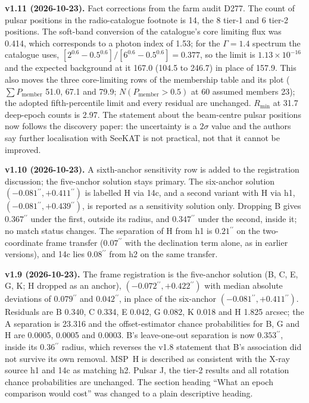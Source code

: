 \documentclass[11pt]{article}
\newcommand{\as}{\ensuremath{^{\prime\prime}}}
\begin{document}
\textbf{v1.11 (2026-10-23).} Fact corrections from the farm audit D277. The count of pulsar positions in the radio-catalogue footnote is 14, the 8 tier-1 and 6 tier-2 positions. The soft-band conversion of the catalogue's core limiting flux was 0.414, which corresponds to a photon index of 1.53; for the $\Gamma=1.4$ spectrum the catalogue uses, $[2^{0.6}-0.5^{0.6}]/[6^{0.6}-0.5^{0.6}] = 0.377$, so the limit is $1.13\times10^{-16}$ and the expected background at it 167.0 (104.5 to 246.7) in place of 157.9. This also moves the three core-limiting rows of the membership table and its plot ($\sum P_{\mathrm{member}}$ 51.0, 67.1 and 79.9; $N(P_{\mathrm{member}}>0.5)$ at 60 assumed members 23); the adopted fifth-percentile limit and every residual are unchanged. $R_{\min}$ at 31.7 deep-epoch counts is 2.97. The statement about the beam-centre pulsar positions now follows the discovery paper: the uncertainty is a $2\sigma$ value and the authors say further localisation with SeeKAT is not practical, not that it cannot be improved.

\textbf{v1.10 (2026-10-23).} A sixth-anchor sensitivity row is added to the registration discussion; the five-anchor solution stays primary. The six-anchor solution $(-0.081\as, +0.411\as)$ is labelled H via 14c, and a second variant with H via h1, $(-0.081\as, +0.439\as)$, is reported as a sensitivity solution only. Dropping B gives $0.367\as$ under the first, outside its radius, and $0.347\as$ under the second, inside it; no match status changes. The separation of H from h1 is $0.21\as$ on the two-coordinate frame transfer ($0.07\as$ with the declination term alone, as in earlier versions), and 14c lies $0.08\as$ from h2 on the same transfer.

\textbf{v1.9 (2026-10-23).} The frame registration is the five-anchor solution (B, C, E, G, K; H dropped as an anchor), $(-0.072\as, +0.422\as)$ with median absolute deviations of $0.079\as$ and $0.042\as$, in place of the six-anchor $(-0.081\as, +0.411\as)$. Residuals are B 0.340, C 0.334, E 0.042, G 0.082, K 0.018 and H 1.825 arcsec; the A separation is 23.316 and the offset-estimator chance probabilities for B, G and H are 0.0005, 0.0005 and 0.0003. B's leave-one-out separation is now $0.353\as$, inside its $0.36\as$ radius, which reverses the v1.8 statement that B's association did not survive its own removal. MSP~H is described as consistent with the X-ray source h1 and 14c as matching h2. Pulsar J, the tier-2 results and all rotation chance probabilities are unchanged. The section heading ``What an epoch comparison would cost'' was changed to a plain descriptive heading.
\end{document}
